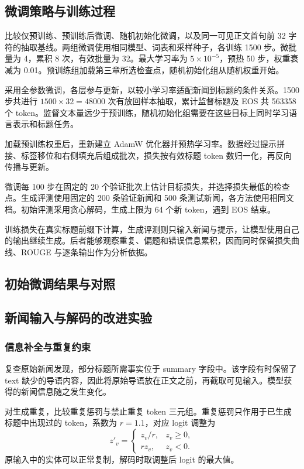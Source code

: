 \documentclass[UTF8,a4paper,12pt,fontset=fandol]{ctexart}
\begin{document}
\subsection{微调策略与训练过程}
比较仅预训练、预训练后微调、随机初始化微调，以及同一可见正文首句前 32 字符的抽取基线。两组微调使用相同模型、词表和采样种子，各训练 1500 步。微批量为 4，累积 8 次，有效批量为 32。最大学习率为 $5\times10^{-5}$，预热 50 步，权重衰减为 0.01。预训练组加载第三章所选检查点，随机初始化组从随机权重开始。

采用全参数微调，各层参与更新，以较小学习率适配新闻到标题的条件关系。1500 步共进行 $1500\times32=48000$ 次有放回样本抽取，累计监督标题及 EOS 共 563358 个 token。监督文本量远少于预训练，随机初始化组需要在这些目标上同时学习语言表示和标题任务。

加载预训练权重后，重新建立 AdamW 优化器并预热学习率。数据经过提示拼接、标签移位和右侧填充后组成批次，损失按有效标题 token 数归一化，再反向传播与更新。

微调每 100 步在固定的 20 个验证批次上估计目标损失，并选择损失最低的检查点。生成评测使用固定的 200 条验证新闻和 500 条测试新闻，各方法使用相同文档。初始评测采用贪心解码，生成上限为 64 个新 token，遇到 EOS 结束。

训练损失在真实标题前缀下计算，生成评测则只输入新闻与提示，让模型使用自己的输出继续生成。后者能够观察重复、偏题和错误信息累积，因而同时保留损失曲线、ROUGE 与逐条输出作为分析依据。

\subsection{初始微调结果与对照}


\subsection{新闻输入与解码的改进实验}
\subsubsection{信息补全与重复约束}
复查原始新闻发现，部分标题所需事实位于 summary 字段中。该字段有时保留了 text 缺少的导语内容，因此将原始导语放在正文之前，再截取可见输入。模型获得的新闻信息随之发生变化。

对生成重复，比较重复惩罚与禁止重复 token 三元组。重复惩罚只作用于已生成标题中出现过的 token，系数为 $r=1.1$，对应 logit 调整为
\begin{equation}
 z'_v=\begin{cases}z_v/r,&z_v\ge0,\\r z_v,&z_v<0.\end{cases}
\end{equation}
原输入中的实体可以正常复制，解码时取调整后 logit 的最大值。
\end{document}

